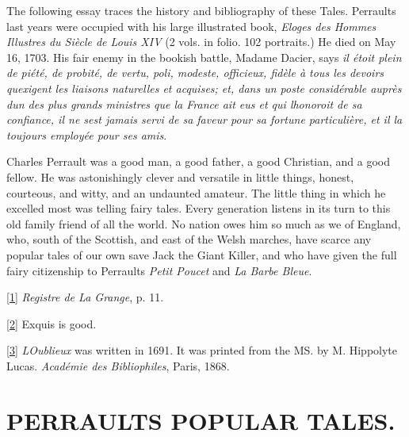 \documentclass[14pt,a4paper]{memoir}
\begin{document}
The following essay traces the history and bibliography of these Tales.
Perrault\textquotesingle s last years were occupied with his large
illustrated book, \emph{Eloges des Hommes Illustres du Siècle de Louis
XIV} (2 vols. in folio. 102 portraits.) He died on May 16, 1703. His
fair enemy in the bookish battle, Madame Dacier, says
\textquotesingle{}\emph{il étoit plein de piété, de probité, de vertu,
poli, modeste, officieux, fidèle à tous les devoirs
qu\textquotesingle exigent les liaisons naturelles et acquises; et, dans
un poste considérable auprès d\textquotesingle un des plus grands
ministres que la France ait eus et qui l\textquotesingle honoroit de sa
confiance, il ne s\textquotesingle est jamais servi de sa faveur pour sa
fortune particulière, et il l\textquotesingle a toujours employée pour
ses amis}.\textquotesingle{}

Charles Perrault was a good man, a good father, a good Christian, and a
good fellow. He was astonishingly clever and versatile in little things,
honest, courteous, and witty, and an undaunted amateur. The little thing
in which he excelled most was telling fairy tales. Every generation
listens in its turn to this old family friend of all the world. No
nation owes him so much as we of England, who, south of the Scottish,
and east of the Welsh marches, have scarce any popular tales of our own
save Jack the Giant Killer, and who have given the full fairy
citizenship to Perrault\textquotesingle s \emph{Petit Poucet} and
\emph{La Barbe Bleue}.

\protect\hypertarget{4533318093929944247_33931-h-0.htm.xhtmlux5cux23Footnote_1}{}{}\protect\hyperlink{4533318093929944247_33931-h-0.htm.xhtmlux5cux23FNanchor_1}{{{[}1{]}}}
\emph{Registre de La Grange}, p. 11.

\protect\hypertarget{4533318093929944247_33931-h-0.htm.xhtmlux5cux23Footnote_2}{}{}\protect\hyperlink{4533318093929944247_33931-h-0.htm.xhtmlux5cux23FNanchor_2}{{{[}2{]}}}
\textquotesingle Exquis\textquotesingle{} is good.

\protect\hypertarget{4533318093929944247_33931-h-0.htm.xhtmlux5cux23Footnote_3}{}{}\protect\hyperlink{4533318093929944247_33931-h-0.htm.xhtmlux5cux23FNanchor_3}{{{[}3{]}}}
\emph{L\textquotesingle Oublieux} was written in 1691. It was printed
from the MS. by M. Hippolyte Lucas. \emph{Académie des Bibliophiles},
Paris, 1868.

\hypertarget{4533318093929944247_33931-h-0.htm.xhtmlux5cux23pgepubid00010}{%
\section{PERRAULT\textquotesingle S POPULAR
TALES.}\label{4533318093929944247_33931-h-0.htm.xhtmlux5cux23pgepubid00010}}
\end{document}
